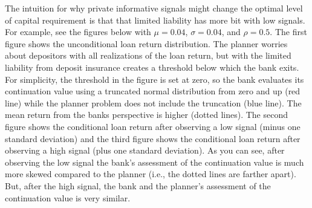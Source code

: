 \documentclass[12pt]{article}
\begin{document}
The intuition for why private informative signals might change the optimal level of capital requirement is that that limited liability has more bit with low signals.  For example, see the figures below with $\mu = 0.04$, $\sigma = 0.04$, and $\rho = 0.5$.  The first figure shows the unconditional loan return distribution.  The planner worries about depositors with all realizations of the loan return, but with the limited liability from deposit insurance creates a threshold below which the bank exits.  For simplicity, the threshold in the figure is set at zero, so the bank evaluates its continuation value using a truncated normal distribution from zero and up (red line) while the planner problem does not include the truncation (blue line).  The mean return from the banks perspective is higher (dotted lines).  The second figure shows the conditional loan return after observing a low signal (minus one standard deviation) and the third figure shows the conditional loan return after observing a high signal (plus one standard deviation). As you can see, after observing the low signal the bank's assessment of the continuation value is much more skewed compared to the planner (i.e., the dotted lines are farther apart). But, after the high signal, the bank and the planner's assessment of the continuation value is very similar.
\end{document}
